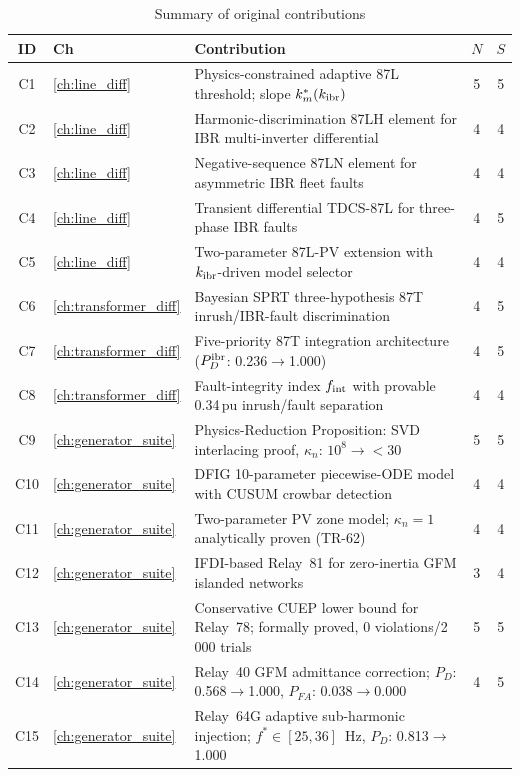 \begin{table}[htbp]
\caption{Summary of original contributions}
\label{tab:ch1_contributions}
\small
\begin{tabularx}{\textwidth}{@{}clp{8.5cm}cc@{}}
\toprule
ID & Ch & Contribution & $N$ & $S$ \\
\midrule
C1  & \ref{ch:line_diff}
  & Physics-constrained adaptive 87L threshold; slope $k_m^\ast(k_{\mathrm{ibr}})$
  & 5 & 5 \\
C2  & \ref{ch:line_diff}
  & Harmonic-discrimination 87LH element for IBR multi-inverter differential
  & 4 & 4 \\
C3  & \ref{ch:line_diff}
  & Negative-sequence 87LN element for asymmetric IBR fleet faults
  & 4 & 4 \\
C4  & \ref{ch:line_diff}
  & Transient differential TDCS-87L for three-phase IBR faults
  & 4 & 5 \\
C5  & \ref{ch:line_diff}
  & Two-parameter 87L-PV extension with $k_{\rm ibr}$-driven model selector
  & 4 & 4 \\
C6  & \ref{ch:transformer_diff}
  & Bayesian SPRT three-hypothesis 87T inrush/IBR-fault discrimination
  & 4 & 5 \\
C7  & \ref{ch:transformer_diff}
  & Five-priority 87T integration architecture ($P_D^{\rm ibr}$: 0.236$\to$1.000)
  & 4 & 5 \\
C8  & \ref{ch:transformer_diff}
  & Fault-integrity index $f_{\rm int}$ with provable 0.34\,pu inrush/fault separation
  & 4 & 4 \\
C9  & \ref{ch:generator_suite}
  & Physics-Reduction Proposition: SVD interlacing proof, $\kappa_n$: $10^8\to{<}30$
  & 5 & 5 \\
C10 & \ref{ch:generator_suite}
  & DFIG 10-parameter piecewise-ODE model with CUSUM crowbar detection
  & 4 & 4 \\
C11 & \ref{ch:generator_suite}
  & Two-parameter PV zone model; $\kappa_n=1$ analytically proven (TR-62)
  & 4 & 4 \\
C12 & \ref{ch:generator_suite}
  & IFDI-based Relay~81 for zero-inertia GFM islanded networks
  & 3 & 4 \\
C13 & \ref{ch:generator_suite}
  & Conservative CUEP lower bound for Relay~78; formally proved, 0 violations/2\,000 trials
  & 5 & 5 \\
C14 & \ref{ch:generator_suite}
  & Relay~40 GFM admittance correction; $P_D$: 0.568$\to$1.000, $P_{FA}$: 0.038$\to$0.000
  & 4 & 5 \\
C15 & \ref{ch:generator_suite}
  & Relay~64G adaptive sub-harmonic injection; $f^\ast\in[25,36]$~Hz, $P_D$: 0.813$\to$1.000

\end{tabularx}
\end{table}
